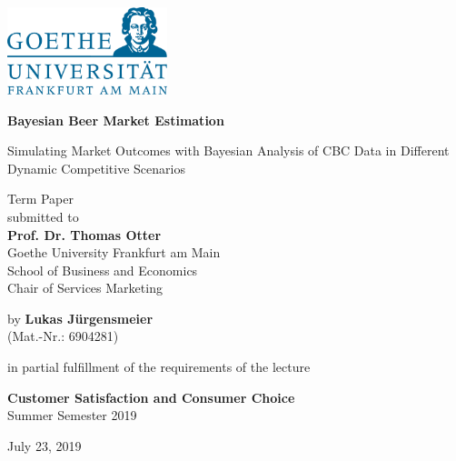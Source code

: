 \documentclass[12pt,a4paper]{article}
\begin{document}
\begin{center}
 \includegraphics[width=0.35\textwidth]{GU-Logo-blau-CMYK.eps} \vspace{2cm}

 {\Large{\bf Bayesian Beer Market Estimation}} \medskip

  {\Large{Simulating Market Outcomes with Bayesian Analysis of CBC Data in Different Dynamic Competitive Scenarios}} \vspace{3cm}  

  Term Paper \\\vspace{2cm}
  submitted to \\\vspace{0.5cm}
  \textbf{Prof. Dr. Thomas Otter} \\\vspace{0.5cm}
  Goethe University Frankfurt am Main \\
  School of Business and Economics \\
  Chair of Services Marketing \vspace{2cm}
  
  by \medskip
  \textbf{Lukas J\"urgensmeier} \\
  (Mat.-Nr.: 6904281) \\
  
  \bigskip

  in partial fulfillment of the requirements of the lecture \medskip

 {\bf Customer Satisfaction and Consumer Choice} \\
  Summer Semester 2019\\
  \medskip

  July 23, 2019
  
\end{center}


\pagebreak
\pagestyle{plain}
\tableofcontents
\pagebreak
\listoffigures
\listoftables
\renewcommand\lstlistlistingname{List of R Code Chunks}
\lstlistoflistings
\newpage
\setcounter{page}{2}
\setlength{\baselineskip}{1.5\baselineskip}
\pagestyle{plain}
\end{document}
